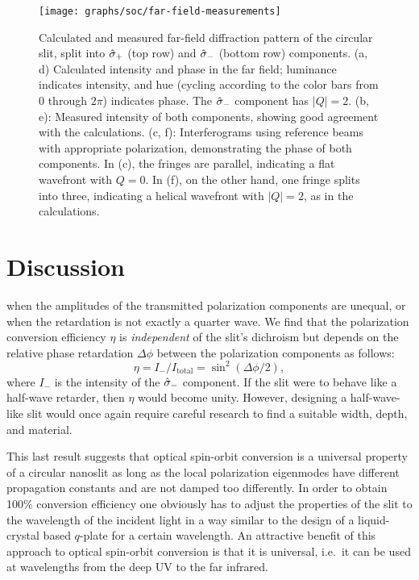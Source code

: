\begin{figure}[tb]
  \forceversofloat\centering
  \texttt{[image: graphs/soc/far-field-measurements]}
  \caption{Calculated and measured far-field diffraction pattern of the circular slit, split into $\hat{\mathbf{\sigma}}_{+}$ (top row) and $\hat{\mathbf{\sigma}}_{-}$ (bottom row) components. (a, d) Calculated intensity and phase in the far field; luminance indicates intensity, and hue (cycling according to the color bars from $0$ through $2\pi $) indicates phase. The $\hat{\mathbf{\sigma}}_{-}$ component has $|Q|=2$. (b, e): Measured intensity of both components, showing good agreement with the calculations. (c, f): Interferograms using reference beams with appropriate polarization, demonstrating the phase of both components. In (c), the fringes are parallel, indicating a flat wavefront with $Q=0$. In (f), on the other hand, one fringe splits into three, indicating a helical wavefront with $|Q|=2$, as in the calculations.}
  \label{far-field-measurements}
\end{figure}

\section{Discussion}

 when the amplitudes of the transmitted polarization components are unequal, or when the retardation is not exactly a quarter wave. We find that the polarization conversion efficiency $\eta $ is \emph{independent} of the slit's dichroism but depends on the relative phase retardation $\Delta \phi $ between the polarization components as follows:
%
\begin{equation}\label{conversion-efficiency}
\eta  = I_{-}/I_{\mathrm{total}} = \sin^2 (\Delta \phi/2) ,
\end{equation}
%
where $I_{-}$ is the intensity of the $\hat{\mathbf{\sigma}}_{-}$ component. If the slit were to behave like a half-wave retarder, then $\eta $ would become unity. However, designing a half-wave-like slit would once again require careful research to find a suitable width, depth, and material.

This last result suggests that optical spin-orbit conversion is a universal property of a circular nanoslit as long as the local polarization eigenmodes have different propagation constants and are not damped too differently. In order to obtain 100\% conversion efficiency one obviously has to adjust the properties of the slit to the wavelength of the incident light in a way similar to the design of a liquid-crystal based $q$-plate \cite{Marrucci2006} for a certain wavelength. An attractive benefit of this approach to optical spin-orbit conversion is that it is universal, i.e.\ it can be used at wavelengths from the deep UV to the far infrared.

